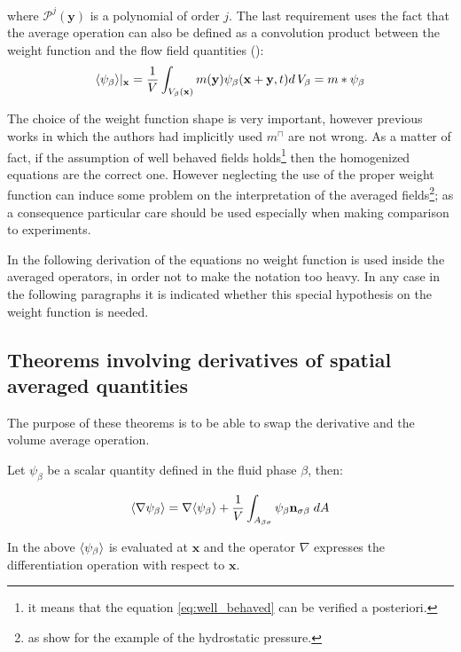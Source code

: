 \noindent where $\mathcal{P}^j(\mathbf{y})$ is a polynomial of order $j$.
The last requirement uses the fact that the average operation can also be defined as a convolution product between the weight function and the flow field quantities (\citet{marle1982macroscopic}):
$$
{\left< \psi_{\beta} \right>}|_{\mathbf{x}} = \dfrac{1}{V} \int_{V_\beta(\mathbf{x})} m(\mathbf{y}) \psi_{\beta}(\mathbf{x}+\mathbf{y}, t) d \, V_\beta = m*\psi_{\beta}
$$

The choice of the weight function shape is very important, however previous works in which the authors had implicitly used $m^{\sqcap}$ are not wrong.
As a matter of fact, if the assumption of well behaved fields holds\footnote{it means that the equation \eqref{eq:well_behaved} can be verified a posteriori.} then the homogenized equations are the correct one.
However neglecting the use of the proper weight function can induce some problem on the interpretation of the averaged fields\footnote{as \citet{quintard1994transport1} show for the example of the hydrostatic pressure.}; as a consequence particular care should be used especially when making comparison to experiments.

In the following derivation of the equations no weight function is used inside the averaged operators, in order not to make the notation too heavy.
In any case in the following paragraphs it is indicated whether this special hypothesis on the weight function is needed.

\subsection{Theorems involving derivatives of spatial averaged quantities}

The purpose of these theorems is to be able to swap the derivative and the volume average operation.

\begin{theorem}
Let $\psi_{\beta}$ be a scalar quantity defined in the fluid phase $\beta$, then:

	\begin{equation}
		{\left< \nabla \psi_{\beta} \right>} = \nabla {\left< \psi_{\beta} \right>} + \dfrac{1}{V} \int_{A_{\beta \sigma}} \psi_{\beta} \mathbf{n}_{\sigma \beta}   \;dA
			\label{th:spat_avg}
	\end{equation}
\end{theorem}

In the above ${\left< \psi_{\beta} \right>}$ is evaluated at $\mathbf{x}$ and the operator $\nabla$ expresses the differentiation operation with respect to $\mathbf{x}$.

